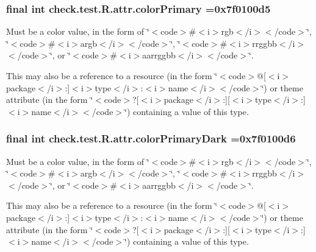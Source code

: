 \subsubsection[{color\+Primary}]{\setlength{\rightskip}{0pt plus 5cm}final int check.\+test.\+R.\+attr.\+color\+Primary =0x7f0100d5\hspace{0.3cm}{\ttfamily [static]}}\label{classcheck_1_1test_1_1_r_1_1attr_a0b0ddf92c45ba1dc992336304fdcd1f9}
Must be a color value, in the form of \char`\"{}$<$code$>$\#$<$i$>$rgb$<$/i$>$$<$/code$>$\char`\"{}, \char`\"{}$<$code$>$\#$<$i$>$argb$<$/i$>$$<$/code$>$\char`\"{}, \char`\"{}$<$code$>$\#$<$i$>$rrggbb$<$/i$>$$<$/code$>$\char`\"{}, or \char`\"{}$<$code$>$\#$<$i$>$aarrggbb$<$/i$>$$<$/code$>$\char`\"{}. 

This may also be a reference to a resource (in the form \char`\"{}$<$code$>$@\mbox{[}$<$i$>$package$<$/i$>$\+:\mbox{]}$<$i$>$type$<$/i$>$\+:$<$i$>$name$<$/i$>$$<$/code$>$\char`\"{}) or theme attribute (in the form \char`\"{}$<$code$>$?\mbox{[}$<$i$>$package$<$/i$>$\+:\mbox{]}\mbox{[}$<$i$>$type$<$/i$>$\+:\mbox{]}$<$i$>$name$<$/i$>$$<$/code$>$\char`\"{}) containing a value of this type. \hypertarget{classcheck_1_1test_1_1_r_1_1attr_a2a07aa51383e02b9f388ec5ac6cd9b99}{}
\subsubsection[{color\+Primary\+Dark}]{\setlength{\rightskip}{0pt plus 5cm}final int check.\+test.\+R.\+attr.\+color\+Primary\+Dark =0x7f0100d6\hspace{0.3cm}{\ttfamily [static]}}\label{classcheck_1_1test_1_1_r_1_1attr_a2a07aa51383e02b9f388ec5ac6cd9b99}
Must be a color value, in the form of \char`\"{}$<$code$>$\#$<$i$>$rgb$<$/i$>$$<$/code$>$\char`\"{}, \char`\"{}$<$code$>$\#$<$i$>$argb$<$/i$>$$<$/code$>$\char`\"{}, \char`\"{}$<$code$>$\#$<$i$>$rrggbb$<$/i$>$$<$/code$>$\char`\"{}, or \char`\"{}$<$code$>$\#$<$i$>$aarrggbb$<$/i$>$$<$/code$>$\char`\"{}. 

This may also be a reference to a resource (in the form \char`\"{}$<$code$>$@\mbox{[}$<$i$>$package$<$/i$>$\+:\mbox{]}$<$i$>$type$<$/i$>$\+:$<$i$>$name$<$/i$>$$<$/code$>$\char`\"{}) or theme attribute (in the form \char`\"{}$<$code$>$?\mbox{[}$<$i$>$package$<$/i$>$\+:\mbox{]}\mbox{[}$<$i$>$type$<$/i$>$\+:\mbox{]}$<$i$>$name$<$/i$>$$<$/code$>$\char`\"{}) containing a value of this type. \hypertarget{classcheck_1_1test_1_1_r_1_1attr_a97c7cb59a0e732bdf75408a5029196c7}{}
